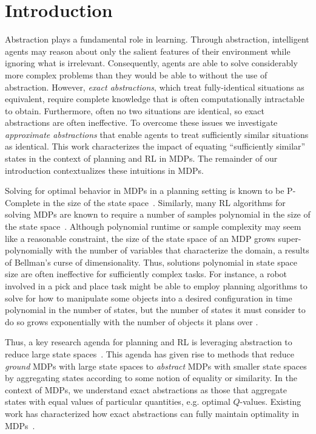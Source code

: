 \section{Introduction}
Abstraction plays a fundamental role in learning. Through abstraction, intelligent agents may reason about only the salient features of their environment while ignoring what is irrelevant. Consequently, agents are able to solve considerably more complex problems than they would be able to without the use of abstraction. However, \textit{exact abstractions}, which treat fully-identical situations as equivalent, require complete knowledge that is often computationally intractable to obtain. Furthermore, often no two situations are identical, so exact abstractions are often ineffective. To overcome these issues we investigate \textit{approximate abstractions} that enable agents to treat sufficiently similar situations as identical. This work characterizes the impact of equating ``sufficiently similar'' states in the context of planning and \ac{RL} in \acp{MDP}. The remainder of our introduction contextualizes these intuitions in \acp{MDP}.

Solving for optimal behavior in \acp{MDP} in a planning setting is known to be P-Complete in the size of the state space~\cite{papadimitriou1987complexity,littman1995complexity}. Similarly, many \ac{RL} algorithms for solving \acp{MDP} are known to require a number of samples polynomial in the size of the state space~\cite{strehl2009reinforcement}. Although polynomial runtime or sample complexity may seem like a reasonable constraint, the size of the state space of an \ac{MDP} grows super-polynomially with the number of variables that characterize the domain, a results of Bellman's curse of dimensionality. Thus, solutions polynomial in state space size are often ineffective for sufficiently complex tasks.  For instance, a robot involved in a pick and place task might be able to employ planning algorithms to solve for how to manipulate some objects into a desired configuration in time polynomial in the number of states, but the number of states it must consider to do so grows exponentially with the number of objects it plans over .

Thus, a key research agenda for planning and \ac{RL} is leveraging abstraction to reduce large state spaces~\cite{andre2002state,jong2005state,dietterich2000hierarchical,Bean2011}. This agenda has given rise to methods that reduce \textit{ground} \acp{MDP} with large state spaces to \textit{abstract} MDPs with smaller state spaces by aggregating states according to some notion of equality or similarity. In the context of \acp{MDP}, we understand exact abstractions as those that aggregate states with equal values of particular quantities, e.g. optimal $Q$-values. Existing work has characterized how exact abstractions can fully maintain optimality in \acp{MDP}~\cite{li2006towards,dean1997modelmin}. 

